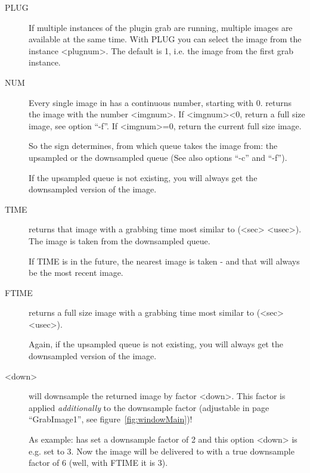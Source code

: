 \begin{description}
  \begin{description}

  \item[PLUG]
    If multiple instances of the plugin grab are running, multiple
    images are available at the same time. With PLUG you can select
    the image from the instance
    \textless{}plugnum\textgreater{}. The default is 1, i.e. the
    image from the first grab instance.

  \item[NUM]
    Every single image in \icewing{} has a continuous number,
    starting with 0. \icewing{} returns the image with the number
    \textless{}imgnum\textgreater{}. If
    \textless{}imgnum\textgreater{}\textless{}0, return a full size
    image, see option ``-f''. If \textless{}imgnum\textgreater{}=0,
    return the current full size image.

    So the sign determines, from which queue \icewing{} takes the
    image from: the upsampled or the downsampled queue (See also
    options ``-c'' and ``-f'').

    If the upsampled queue is not existing, you will always get the
    downsampled version of the image.

  \item[TIME]
    \icewing{} returns that image with a grabbing time most similar
    to (\textless{}sec\textgreater{}
    \textless{}usec\textgreater{}). The image is taken from the
    downsampled queue.

    If TIME is in the future, the nearest image is taken - and that
    will always be the most recent image.

  \item[FTIME]
    \icewing{} returns a full size image with a grabbing time most
    similar to (\textless{}sec\textgreater{}
    \textless{}usec\textgreater{}).

    Again, if the upsampled queue is not existing, you will always
    get the downsampled version of the image.

  \item[\textless{}down\textgreater{}]
    \icewing{} will downsample the returned image by factor
    \textless{}down\textgreater{}. This factor is applied {\em
    additionally} to the \icewing{} downsample factor (adjustable in
    page ``GrabImage1'', see figure~\ref{fig:windowMain})!

    As example: \icewing{} has set a downsample factor of 2 and this
    option \textless{}down\textgreater{} is e.g. set to 3. Now the
    image will be delivered to \dacs{} with a true downsample factor
    of 6 (well, with FTIME it is 3).


\end{description}
\end{description}
